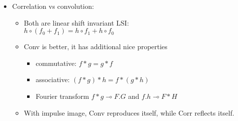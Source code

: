 \begin{itemize}
\begin{align*}
		&\text{- Valid:} \tab \text{output size} = f-g && \begin{tikzpicture}[scale=0.5]\draw[green, very thick] (0,0) rectangle (2,2) node[pos=.5]{$f$};
			\draw[red, very thick] (1.5,1.5) rectangle (2,2) node[pos=1.7]{$g$};
			\draw[red, very thick] (0,0) rectangle (.5,.5);
			\draw[red, very thick] (2,0) rectangle (1.5,.5);
			\draw[red, very thick] (0,2) rectangle (.5,1.5);
			\draw[gray, thick, dashed] (.5,.25) -- (1.5,0.25);
			\draw[gray, thick, dashed] (.25,.5) -- (.25,1.5);
			\draw[gray, thick, dashed] (1.75,.5) -- (1.75,1.5);
			\draw[gray, thick, dashed] (.5,1.75) -- (1.5,1.75);
		\end{tikzpicture}
	\end{align*}
	:
	\begin{itemize}
		\item Clip filter (black) $\Rightarrow$ dark border
		\item Wrap around
		\item Copy edge $\Rightarrow$ Strong edge response
		\item Reflect across edge
	\end{itemize}
	\item Correlation \ac{vs} convolution:
	\begin{itemize}
		\item Both are linear shift invariant \ac{LSI}:\\
		\tab $h \circ (f_0 + f_1) = h \circ f_1 + h \circ f_0$
		\item Conv is better, it has additional nice properties
		\begin{itemize}
			\item commutative: $f*g = g*f$
			\item associative: $(f*g)*h = f*(g*h)$
			\item Fourier transform $f*g \multimap F.G$ and $f.h \multimap F*H$
		\end{itemize}
		\item With impulse image, Conv reproduces itself, while Corr reflects itself.
	\end{itemize}	
\end{itemize}


